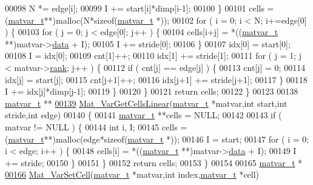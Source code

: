 \begin{DoxyCode}
00098         N *= edge[i];
00099         I += start[i]*dimp[i-1];
00100     \}
00101     cells = (\hyperlink{group___m_a_t_structmatvar__t}{matvar\_t}**)malloc(N*\textcolor{keyword}{sizeof}(\hyperlink{group___m_a_t_structmatvar__t}{matvar\_t} *));
00102     \textcolor{keywordflow}{for} ( i = 0; i < N; i+=edge[0] ) \{
00103         \textcolor{keywordflow}{for} ( j = 0; j < edge[0]; j++ ) \{
00104             cells[i+j] = *((\hyperlink{group___m_a_t_structmatvar__t}{matvar\_t} **)matvar->\hyperlink{group___m_a_t_a5672978efa230bbdecdf38ede781f7fa}{data} + I);
00105             I += stride[0];
00106         \}
00107         idx[0] = start[0];
00108         I = idx[0];
00109         cnt[1]++;
00110         idx[1] += stride[1];
00111         \textcolor{keywordflow}{for} ( j = 1; j < matvar->\hyperlink{group___m_a_t_a84ba70c96ded13cc555fa75b768d9921}{rank}; j++ ) \{
00112             \textcolor{keywordflow}{if} ( cnt[j] == edge[j] ) \{
00113                 cnt[j] = 0;
00114                 idx[j] = start[j];
00115                 cnt[j+1]++;
00116                 idx[j+1] += stride[j+1];
00117             \}
00118             I += idx[j]*dimp[j-1];
00119         \}
00120     \}
00121     \textcolor{keywordflow}{return} cells;
00122 \}
00123 
00138 \hyperlink{group___m_a_t_structmatvar__t}{matvar\_t} **
\hyperlink{group___m_a_t_ga004987d665654409f74eaf8e82bb1380}{00139} \hyperlink{group___m_a_t_ga004987d665654409f74eaf8e82bb1380}{Mat\_VarGetCellsLinear}(\hyperlink{group___m_a_t_structmatvar__t}{matvar\_t} *matvar,\textcolor{keywordtype}{int} start,\textcolor{keywordtype}{int} stride,\textcolor{keywordtype}{int} edge)
00140 \{
00141     \hyperlink{group___m_a_t_structmatvar__t}{matvar\_t} **cells = NULL;
00142 
00143     \textcolor{keywordflow}{if} ( matvar != NULL ) \{
00144         \textcolor{keywordtype}{int} i, I;
00145         cells = (\hyperlink{group___m_a_t_structmatvar__t}{matvar\_t}**)malloc(edge*\textcolor{keyword}{sizeof}(\hyperlink{group___m_a_t_structmatvar__t}{matvar\_t} *));
00146         I = start;
00147         \textcolor{keywordflow}{for} ( i = 0; i < edge; i++ ) \{
00148             cells[i] = *((\hyperlink{group___m_a_t_structmatvar__t}{matvar\_t} **)matvar->\hyperlink{group___m_a_t_a5672978efa230bbdecdf38ede781f7fa}{data} + I);
00149             I += stride;
00150         \}
00151     \}
00152     \textcolor{keywordflow}{return} cells;
00153 \}
00154 
00165 \hyperlink{group___m_a_t_structmatvar__t}{matvar\_t} *
\hyperlink{group___m_a_t_ga1b2c36f27ba592206c22c584a30a3c5c}{00166} \hyperlink{group___m_a_t_ga1b2c36f27ba592206c22c584a30a3c5c}{Mat\_VarSetCell}(\hyperlink{group___m_a_t_structmatvar__t}{matvar\_t} *matvar,\textcolor{keywordtype}{int} index,\hyperlink{group___m_a_t_structmatvar__t}{matvar\_t} *cell)

\end{DoxyCode}
